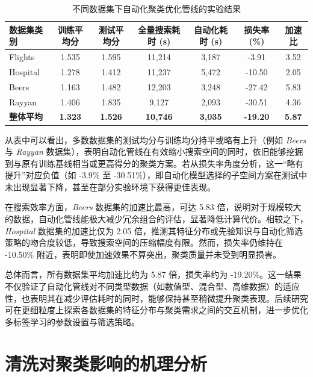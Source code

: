 \documentclass[10pt]{article} %
\numberwithin{equation}{section}
\begin{document}
\begin{table}[htbp]
\centering
\small
\setlength{\tabcolsep}{6pt}
\renewcommand{\arraystretch}{1.1}
\begin{tabular}{lcccccc}
\toprule
\textbf{数据集类别} & \textbf{训练平均分} & \textbf{测试平均分} & \textbf{全量搜索耗时 (s)} & \textbf{自动化耗时 (s)} & \textbf{损失率 (\%)} & \textbf{加速比} \\
\midrule
Flights  & 1.535  & 1.595  & 11,214  & 3,187  & -3.91  & 3.52 \\
Hospital & 1.278  & 1.412  & 11,237  & 5,472  & -10.50 & 2.05 \\
Beers    & 1.163  & 1.482  & 12,203  & 3,248  & -27.42 & 5.83 \\
Rayyan   & 1.406  & 1.835  & 9,127   & 2,093  & -30.51 & 4.36 \\
\midrule
\textbf{整体平均} & \textbf{1.323}  & \textbf{1.526}  & \textbf{10,746}  & \textbf{3,035}  & \textbf{-19.20}  & \textbf{5.87} \\
\bottomrule
\end{tabular}
\caption{不同数据集下自动化聚类优化管线的实验结果}
\label{tab:autoML_res_new}
\end{table}

从表中可以看出，多数数据集的测试均分与训练均分持平或略有上升（例如 \textit{Beers} 与 \textit{Rayyan} 数据集），表明自动化管线在有效缩小搜索空间的同时，依旧能够挖掘到与原有训练基线相当或更高得分的聚类方案。若从损失率角度分析，这一“略有提升”对应负值（如 -3.9\% 至 -30.51\%），即自动化模型选择的子空间方案在测试中未出现显著下降，甚至在部分实验环境下获得更佳表现。

在搜索效率方面，\textit{Beers} 数据集的加速比最高，可达 5.83 倍，说明对于规模较大的数据，自动化管线能极大减少冗余组合的评估，显著降低计算代价。相较之下，\textit{Hospital} 数据集的加速比仅为 2.05 倍，推测其特征分布或先验知识与自动化筛选策略的吻合度较低，导致搜索空间的压缩幅度有限。然而，损失率仍维持在 -10.50\% 附近，表明即使加速效果不算突出，聚类质量并未受到明显损害。

总体而言，所有数据集平均加速比约为 5.87 倍，损失率约为 -19.20\%。这一结果不仅验证了自动化管线对不同类型数据（如数值型、混合型、高维数据）的适应性，也表明其在减少评估耗时的同时，能够保持甚至稍微提升聚类表现。后续研究可在更细粒度上探索各数据集的特征分布与聚类需求之间的交互机制，进一步优化多标签学习的参数设置与筛选策略。

\section{清洗对聚类影响的机理分析}
\label{sec:chapter6}
\end{document}
